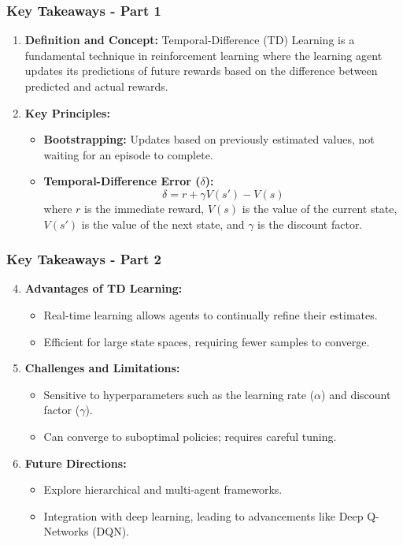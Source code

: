 \documentclass[aspectratio=169]{beamer}
\begin{document}
\begin{frame}[fragile]
    \frametitle{Key Takeaways - Part 1}
    \begin{enumerate}
        \item \textbf{Definition and Concept:}   
        Temporal-Difference (TD) Learning is a fundamental technique in reinforcement learning where the learning agent updates its predictions of future rewards based on the difference between predicted and actual rewards.
        
        \item \textbf{Key Principles:}
        \begin{itemize}
            \item \textbf{Bootstrapping:} Updates based on previously estimated values, not waiting for an episode to complete.
            \item \textbf{Temporal-Difference Error ($\delta$):} 
            \begin{equation}
            \delta = r + \gamma V(s') - V(s)
            \end{equation}
            where $r$ is the immediate reward, $V(s)$ is the value of the current state, $V(s')$ is the value of the next state, and $\gamma$ is the discount factor.
        \end{itemize}
    \end{enumerate}
\end{frame}

\begin{frame}[fragile]
    \frametitle{Key Takeaways - Part 2}
    \begin{enumerate}
        \setcounter{enumi}{3}
        \item \textbf{Advantages of TD Learning:}
        \begin{itemize}
            \item Real-time learning allows agents to continually refine their estimates.
            \item Efficient for large state spaces, requiring fewer samples to converge.
        \end{itemize}

        \item \textbf{Challenges and Limitations:}
        \begin{itemize}
            \item Sensitive to hyperparameters such as the learning rate ($\alpha$) and discount factor ($\gamma$).
            \item Can converge to suboptimal policies; requires careful tuning.
        \end{itemize}

        \item \textbf{Future Directions:}
        \begin{itemize}
            \item Explore hierarchical and multi-agent frameworks.
            \item Integration with deep learning, leading to advancements like Deep Q-Networks (DQN).
        \end{itemize}
    \end{enumerate}
\end{frame}
\end{document}

